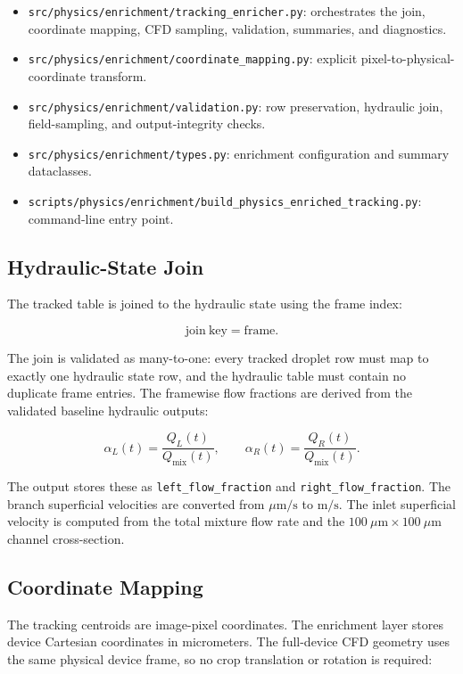 \begin{itemize}
  \item \texttt{src/physics/enrichment/tracking\_enricher.py}: orchestrates the
        join, coordinate mapping, CFD sampling, validation, summaries, and
        diagnostics.
  \item \texttt{src/physics/enrichment/coordinate\_mapping.py}: explicit
        pixel-to-physical-coordinate transform.
  \item \texttt{src/physics/enrichment/validation.py}: row preservation,
        hydraulic join, field-sampling, and output-integrity checks.
  \item \texttt{src/physics/enrichment/types.py}: enrichment configuration and
        summary dataclasses.
  \item \texttt{scripts/physics/enrichment/build\_physics\_enriched\_tracking.py}:
        command-line entry point.
\end{itemize}

\subsection{Hydraulic-State Join}

The tracked table is joined to the hydraulic state using the frame index:

\[
  \mathrm{join~key} = \mathrm{frame}.
\]

The join is validated as many-to-one: every tracked droplet row must map to
exactly one hydraulic state row, and the hydraulic table must contain no
duplicate frame entries. The framewise flow fractions are derived from the
validated baseline hydraulic outputs:

\[
  \alpha_L(t) =
  \frac{Q_L(t)}{Q_{\mathrm{mix}}(t)},
  \qquad
  \alpha_R(t) =
  \frac{Q_R(t)}{Q_{\mathrm{mix}}(t)}.
\]

The output stores these as \texttt{left\_flow\_fraction} and
\texttt{right\_flow\_fraction}. The branch superficial velocities are converted
from \(\mu\mathrm{m/s}\) to \(\mathrm{m/s}\). The inlet superficial velocity is
computed from the total mixture flow rate and the \(100~\mu\mathrm{m}\times
100~\mu\mathrm{m}\) channel cross-section.

\subsection{Coordinate Mapping}

The tracking centroids are image-pixel coordinates. The enrichment layer stores
device Cartesian coordinates in micrometers. The full-device CFD geometry uses
the same physical device frame, so no crop translation or rotation is required:

